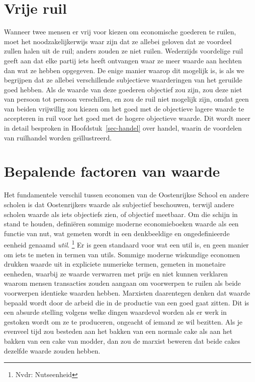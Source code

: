\documentclass[
  a5paper,
  smalldemyvopaper,11pt,twoside,onecolumn,openright,extrafontsizes,
hidelinks]{memoir}
\begin{document}
\section{Vrije ruil}\label{vrije-ruil}

Wanneer twee mensen er vrij voor kiezen om economische goederen te
ruilen, moet het noodzakelijkerwijs waar zijn dat ze allebei geloven dat
ze voordeel zullen halen uit de ruil; anders zouden ze niet ruilen.
Wederzijds voordelige ruil geeft aan dat elke partij iets heeft
ontvangen waar ze meer waarde aan hechten dan wat ze hebben opgegeven.
De enige manier waarop dit mogelijk is, is als we begrijpen dat ze
allebei verschillende subjectieve waarderingen van het geruilde goed
hebben. Als de waarde van deze goederen objectief zou zijn, zou deze
niet van persoon tot persoon verschillen, en zou de ruil niet mogelijk
zijn, omdat geen van beiden vrijwillig zou kiezen om het goed met de
objectieve lagere waarde te accepteren in ruil voor het goed met de
hogere objectieve waarde. Dit wordt meer in detail besproken in
Hoofdstuk~\ref{sec-handel} over handel, waarin de voordelen van
ruilhandel worden geïllustreerd.

\section{Bepalende factoren van
waarde}\label{bepalende-factoren-van-waarde}

Het fundamentele verschil tussen economen van de Oostenrijkse School en
andere scholen is dat Oostenrijkers waarde als subjectief beschouwen,
terwijl andere scholen waarde als iets objectiefs zien, of objectief
meetbaar. Om die schijn in stand te houden, definiëren sommige moderne
economieboeken waarde als een functie van nut, wat gemeten wordt in een
denkbeeldige en ongedefinieerde eenheid genaamd \emph{util}. \footnote{Nvdr:
  Nutseenheid} Er is geen standaard voor wat een util is, en geen manier
om iets te meten in termen van utils. Sommige moderne wiskundige
economen drukken waarde uit in expliciete numerieke termen, gemeten in
monetaire eenheden, waarbij ze waarde verwarren met prijs en niet kunnen
verklaren waarom mensen transacties zouden aangaan om voorwerpen te
ruilen als beide voorwerpen identieke waarden hebben. Marxisten
daarentegen denken dat waarde bepaald wordt door de arbeid die in de
productie van een goed gaat zitten. Dit is een absurde stelling volgens
welke dingen waardevol worden als er werk in gestoken wordt om ze te
produceren, ongeacht of iemand ze wil bezitten. Als je evenveel tijd zou
besteden aan het bakken van een normale cake als aan het bakken van een
cake van modder, dan zou de marxist beweren dat beide cakes dezelfde
waarde zouden hebben.
\end{document}
